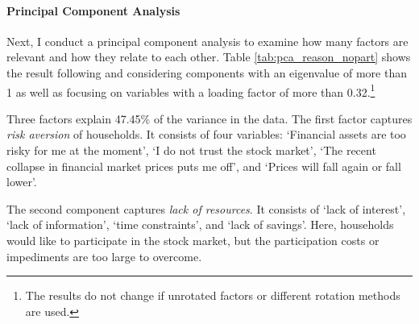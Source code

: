 \documentclass[ProjectABM]{subfiles}
\begin{document}



\paragraph{Principal Component Analysis}

Next, I conduct a principal component analysis to examine how many factors are relevant and how they relate to each other. Table \ref{tab:pca_reason_nopart} shows the result following \cite{choi_2020} and \cite{tabachnick_fidell_2007} considering components with an eigenvalue of more than 1 as well as focusing on variables with a loading factor of more than 0.32.\footnote{The results do not change if unrotated factors or different rotation methods are used.}

Three factors explain 47.45\% of the variance in the data. The first factor captures \textit{risk aversion} of households. It consists of four variables: `Financial assets are too risky for me at the moment', `I do not trust the stock market', `The recent collapse in financial market prices puts me off', and `Prices will fall again or fall lower'. 

The second component captures \textit{lack of resources}. It consists of `lack of interest', `lack of information', `time constraints', and `lack of savings'. Here, households would like to participate in the stock market, but the participation costs or impediments are too large to overcome.
\end{document}
